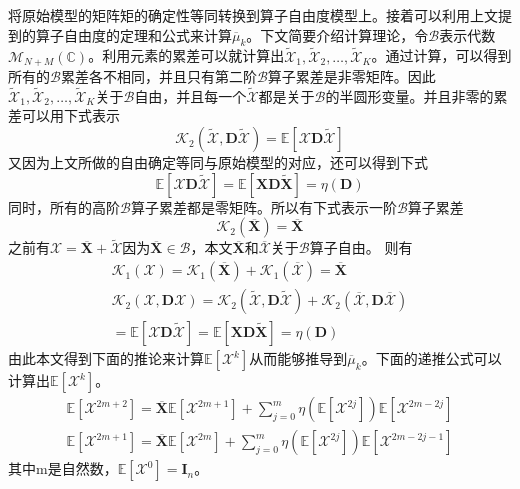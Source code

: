 \documentclass[bachelor,nocolorlinks, printoneside]{seuthesis} %
\begin{document}
\begin{Main}
将原始模型的矩阵矩的确定性等同转换到算子自由度模型上。接着可以利用上文提到的算子自由度的定理和公式来计算$\overline{\mu}_k$。下文简要介绍计算理论，令$\mathcal{B}$表示代数$\mathcal{M}_{N+M}(\mathbb{C})$。利用元素的累差可以就计算出$\tilde{\mathcal{X}}_1,\tilde{\mathcal{X}}_2,\ldots,\tilde{\mathcal{X}}_K$。通过计算，可以得到所有的$\mathcal{B}$累差各不相同，并且只有第二阶$\mathcal{B}$算子累差是非零矩阵。因此$\tilde{\mathcal{X}}_1,\tilde{\mathcal{X}}_2,\ldots,\tilde{\mathcal{X}}_K$关于$\mathcal{B}$自由，并且每一个$\tilde{\mathcal{X}}$都是关于$\mathcal{B}$的半圆形变量。并且非零的累差可以用下式表示
\begin{equation}\label{key}
\mathcal{K}_2(\tilde{\mathcal{X}},\mathbf{D}\tilde{\mathcal{X}})=\mathbb{E}[\mathcal{X}\mathbf{D}\tilde{\mathcal{X}}]
\end{equation}
又因为上文所做的自由确定等同与原始模型的对应，还可以得到下式
\begin{equation}\label{key}
\mathbb{E}[\mathcal{X}\mathbf{D}\tilde{\mathcal{X}}]=
\mathbb{E}[\mathbf{X}\mathbf{D}\tilde{\mathbf{X}}] = \eta(\mathbf{D})
\end{equation}
同时，所有的高阶$\mathcal{B}$算子累差都是零矩阵。所以有下式表示一阶$\mathcal{B}$算子累差
\begin{equation}\label{key}
\mathcal{K}_2(\overline{\mathbf{X}}) = \overline{\mathbf{X}}
\end{equation}
之前有$\mathcal{X}=\overline{\mathbf{X}}+\tilde{\mathcal{X}}$因为$\overline{\mathbf{X}}\in \mathcal{B}$，本文$\overline{\mathbf{X}}$和$\overline{\mathcal{X}}$关于$\mathcal{B}$算子自由。
则有
\begin{gather}\label{key}
\mathcal{K}_1(\mathcal{X}) = \mathcal{K}_1(\overline{\mathbf{X}}) + \mathcal{K}_1(\overline{\mathcal{X}}) = \overline{\mathbf{X}} \nonumber\\
\mathcal{K}_2({\mathcal{X}},\mathbf{D}{\mathcal{X}})=\mathcal{K}_2(\tilde{\mathcal{X}},\mathbf{D}\tilde{\mathcal{X}}) + \mathcal{K}_2(\overline{\mathcal{X}},\mathbf{D}\overline{\mathcal{X}})\\ =\mathbb{E}[\mathcal{X}\mathbf{D}\tilde{\mathcal{X}}]\nonumber = 
\mathbb{E}[\mathbf{X}\mathbf{D}\tilde{\mathbf{X}}] = \eta(\mathbf{D})
\end{gather}
由此本文得到下面的推论来计算$\mathbb{E}[\mathcal{X}^k]$从而能够推导到$\overline{\mu}_k$。下面的递推公式可以计算出$\mathbb{E}[\mathcal{X}^k]$。
\begin{eqnarray}\label{key}
\mathbb{E}[\mathcal{X}^{2m+2}]=\overline{\mathbf{X}}\mathbb{E}[\mathcal{X}^{2m+1}]+\sum_{j=0}^{m}\eta(\mathbb{E}[\mathcal{X}^{2j}])\mathbb{E}[\mathcal{X}^{2m-2j}]  \\
\mathbb{E}[\mathcal{X}^{2m+1}]=\overline{\mathbf{X}}\mathbb{E}[\mathcal{X}^{2m}]+\sum_{j=0}^{m}\eta(\mathbb{E}[\mathcal{X}^{2j}])\mathbb{E}[\mathcal{X}^{2m-2j-1}] 
\end{eqnarray}
其中m是自然数，$\mathbb{E}[\mathcal{X}^0] = \mathbf{I}_n$。


\end{Main}
\end{document}
